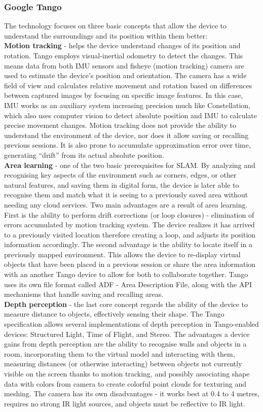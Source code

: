 \documentclass[12pt, a4paper]{article}
\begin{document}
\subsubsection{Google Tango}
The technology focuses on three basic concepts that allow the device to understand the surroundings and its position within them better:\\
\textbf{Motion tracking} - helps the device understand changes of its position and rotation. Tango employs visual-inertial odometry to detect the changes. This means data from both IMU sensors and fisheye (motion tracking) camera are used to estimate the device’s position and orientation. The camera has a wide field of view and calculates relative movement and rotation based on differences between captured images by focusing on specific image features. In this case, IMU works as an auxiliary system increasing precision much like Constellation, which also uses computer vision to detect absolute position and IMU to calculate precise movement changes. Motion tracking does not provide the ability to understand the environment of the device, nor does it allow saving or recalling previous sessions. It is also prone to accumulate approximation error over time, generating “drift” from its actual absolute position.\\
\textbf{Area learning} - one of the two basic prerequisites for SLAM. By analyzing and recognising key aspects of the environment such as corners, edges, or other natural features, and saving them in digital form, the device is later able to recognise them and match what it is seeing to a previously saved area without needing any cloud services. Two main advantages are a result of area learning. First is the ability to perform drift corrections (or loop closures) - elimination of errors accumulated by motion tracking system. The device realizes it has arrived to a previously visited location therefore creating a loop, and adjusts its position information accordingly. The second advantage is the ability to locate itself in a previously mapped environment. This allows the device to re-display virtual objects that have been placed in a previous session or share the area information with an another Tango device to allow for both to collaborate together. Tango uses its own file format called ADF - Area Description File, along with the API mechanisms that handle saving and recalling areas.\\
\textbf{Depth perception} - the last core concept regards the ability of the device to measure distance to objects, effectively sensing their shape. The Tango specification allows several implementations of depth perception in Tango-enabled devices: Structured Light, Time of Flight, and Stereo. The advantages a device gains from depth perception are the ability to recognise walls and objects in a room, incorporating them to the virtual model and interacting with them, measuring distances (or otherwise interacting) between objects not currently visible on the screen thanks to motion tracking, and possibly associating shape data with colors from camera to create colorful point clouds for texturing and meshing. The camera has its own disadvantages - it works best at 0.4 to 4 metres, requires no strong IR light sources, and objects must be reflective to IR light.
\end{document}
